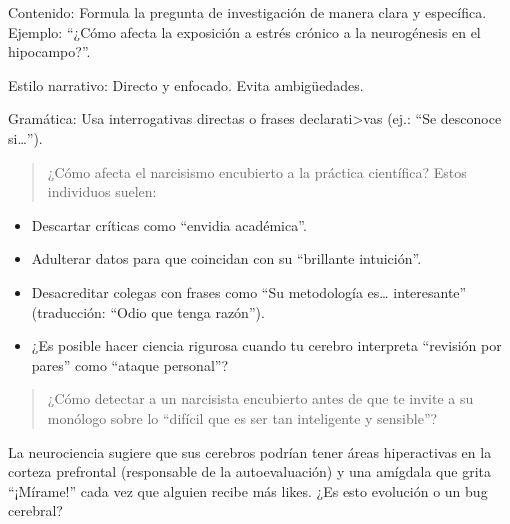 \documentclass[
  10pt]{article}
\providecommand{\tightlist}{%
  \setlength{\itemsep}{0pt}\setlength{\parskip}{0pt}}\usepackage{longtable,booktabs,array}
\begin{document}
\begin{tcolorbox}[enhanced jigsaw, colframe=quarto-callout-tip-color-frame, toprule=.15mm, opacitybacktitle=0.6, arc=.35mm, coltitle=black, title=\textcolor{quarto-callout-tip-color}{\faLightbulb}\hspace{0.5em}{Tip}, breakable, rightrule=.15mm, bottomtitle=1mm, titlerule=0mm, leftrule=.75mm, opacityback=0, colbacktitle=quarto-callout-tip-color!10!white, colback=white, left=2mm, bottomrule=.15mm, toptitle=1mm]

Contenido: Formula la pregunta de investigación de manera clara y
específica. Ejemplo: ``¿Cómo afecta la exposición a estrés crónico a la
neurogénesis en el hipocampo?''.

Estilo narrativo: Directo y enfocado. Evita ambigüedades.

Gramática: Usa interrogativas directas o frases
declarati\textgreater vas (ej.: ``Se desconoce si\ldots{}'').

\end{tcolorbox}

\begin{quote}
¿Cómo afecta el narcisismo encubierto a la práctica científica? Estos
individuos suelen:
\end{quote}

\begin{itemize}
\tightlist
\item
  Descartar críticas como ``envidia académica''.
\item
  Adulterar datos para que coincidan con su ``brillante intuición''.
\item
  Desacreditar colegas con frases como ``Su metodología es\ldots{}
  interesante'' (traducción: ``Odio que tenga razón'').
\item
  ¿Es posible hacer ciencia rigurosa cuando tu cerebro interpreta
  ``revisión por pares'' como ``ataque personal''?
\end{itemize}

\begin{quote}
¿Cómo detectar a un narcisista encubierto antes de que te invite a su
monólogo sobre lo ``difícil que es ser tan inteligente y sensible''?
\end{quote}

La neurociencia sugiere que sus cerebros podrían tener áreas
hiperactivas en la corteza prefrontal (responsable de la autoevaluación)
y una amígdala que grita ``¡Mírame!'' cada vez que alguien recibe más
likes. ¿Es esto evolución o un bug cerebral?
\end{document}
